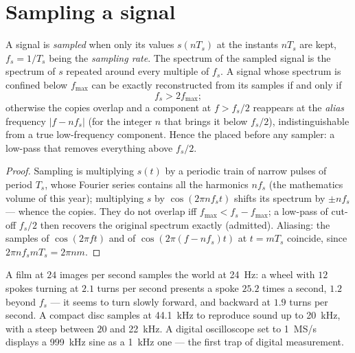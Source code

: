 \section{Sampling a signal}

\begin{theorem}\label{thm:b2:feedback-oscillators:shannon}
A signal is \emph{sampled} when only its values $s(nT_s)$ at the
instants $nT_s$ are kept, $f_s = 1/T_s$ being the \emph{sampling rate}.
The spectrum of the sampled signal is the spectrum of $s$ repeated
around every multiple of $f_s$. A signal whose spectrum is confined
below $f_{\max}$ can be exactly reconstructed from its samples if and
only if
\[
f_s > 2f_{\max} ;
\]
otherwise the copies overlap and a component at $f > f_s/2$ reappears
at the \emph{alias} frequency $|f - nf_s|$ (for the integer $n$ that
brings it below $f_s/2$), indistinguishable from a true low-frequency
component. Hence the \emph{} placed before any
sampler: a low-pass that removes everything above $f_s/2$.
\end{theorem}

\begin{proof}
Sampling is multiplying $s(t)$ by a periodic train of narrow pulses of
period $T_s$, whose Fourier series contains all the harmonics $nf_s$
(the mathematics volume of this year); multiplying $s$ by $\cos(2\pi nf_st)$
shifts its spectrum by $\pm nf_s$ --- whence the copies. They do not
overlap iff $f_{\max} < f_s - f_{\max}$; a low-pass of cut-off $f_s/2$ then
recovers the original spectrum exactly (admitted). Aliasing: the
samples of $\cos(2\pi ft)$ and of $\cos(2\pi(f - nf_s)t)$ at $t = mT_s$
coincide, since $2\pi nf_smT_s = 2\pi nm$.
\end{proof}

\begin{example}\label{ex:b2:feedback-oscillators:alias}
A film at $24$ images per second samples the world at \qty{24}{Hz}: a
wheel with $12$ spokes turning at $2.1$ turns per second presents a spoke
$25.2$ times a second, $1.2$ beyond $f_s$ --- it seems to turn slowly
forward, and backward at $1.9$ turns per second. A compact disc samples
at \qty{44.1}{kHz} to reproduce sound up to \qty{20}{kHz}, with a steep
 between $20$ and \qty{22}{kHz}. A digital oscilloscope
set to \qty{1}{MS/s} displays a \qty{999}{kHz} sine as a \qty{1}{kHz} one ---
the first trap of digital measurement.
\end{example}

